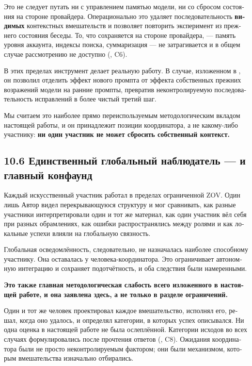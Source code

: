 \begin{russian}
Это не следует путать ни с управлением памятью модели, ни со сбросом состояния на стороне провайдера. Операционально это удаляет последовательность \textbf{видимых} контекстных вмешательств и позволяет повторить эксперимент из прежнего состояния беседы. То, что сохраняется на стороне провайдера, — память уровня аккаунта, индексы поиска, суммаризация — не затрагивается и в общем случае рассмотрению не доступно (, C6).

В этих пределах инструмент делает реальную работу. В случае, изложенном в , он позволил отделить эффект нового промпта от эффекта собственных прежних возражений модели на ранние промпты, превратив неконтролируемую последовательность исправлений в более чистый третий шаг.

Мы считаем это наиболее прямо переиспользуемым методологическим вкладом настоящей работы, и он принадлежит позиции координатора, а не какому-либо участнику: \textbf{ни один участник не может сбросить собственный контекст.}


\subsection*{10.6 Единственный глобальный наблюдатель — и главный конфаунд}
\label{sec:ru:10.6}

Каждый искусственный участник работал в пределах ограниченной ZOV. Один лишь Автор видел перекрывающуюся структуру и мог сравнивать, как разные участники интерпретировали один и тот же материал, как один участник вёл себя при разных обрамлениях, как ошибки распространялись между ролями и как локальные успехи влияли на глобальную связность.

Глобальная осведомлённость, следовательно, не назначалась наиболее способному участнику. Она оставалась у человека-координатора. Это ограничивает автономную интеграцию и сохраняет подотчётность, и оба следствия были намеренными.

\textbf{Это также главная методологическая слабость всего изложенного в настоящей работе, и она заявлена здесь, а не только в разделе ограничений.}

Один и тот же человек проектировал каждое вмешательство, исполнял его, решал, когда оно удалось, и определял категории, в которых успех описывался. Ни одна оценка в настоящей работе не была ослеплённой. Категории исходов во всех случаях формулировались после прочтения ответов (, C8). Ожидания координатора были не просто неконтролируемым фактором; они были механизмом, которым вмешательства изначально отбирались.


\end{russian}
